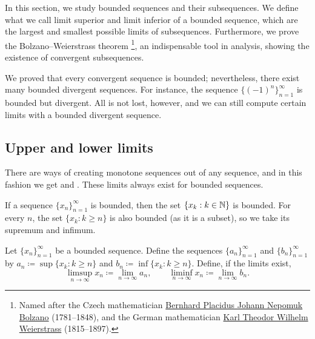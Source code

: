 
In this section, we study bounded sequences and their subsequences.
We define what we call limit superior and limit inferior
of a bounded sequence, which are the largest and smallest
possible limits of subsequences.
Furthermore, we prove the
Bolzano--Weierstrass theorem%
\footnote{%
Named after the Czech mathematician
\href{https://en.wikipedia.org/wiki/Bernard_Bolzano}{Bernhard Placidus Johann Nepomuk Bolzano}
(1781--1848), and the German mathematician
\href{https://en.wikipedia.org/wiki/Karl_Weierstrass}{Karl Theodor Wilhelm Weierstrass}
(1815--1897).}, an
indispensable tool in analysis, showing the existence of convergent
subsequences.

We proved that every convergent sequence is bounded; nevertheless,
there exist many bounded divergent sequences.  For instance,
the sequence $\bigl\{ {(-1)}^n \bigr\}_{n=1}^\infty$ is bounded
but divergent.  All is not lost, however, and we can
still compute certain limits with a bounded divergent sequence.

\subsection{Upper and lower limits}

There are ways of creating monotone sequences out of any sequence, and
in this fashion we
get \emph{} and
\emph{}.  These limits always exist for bounded
sequences.

If a sequence $\{ x_n \}_{n=1}^\infty$ is bounded, then 
the set $\{ x_k : k \in {\mathbb{N}} \}$ is bounded.  For every $n$,
the set $\{ x_k : k \geq n \}$ is also bounded (as it is a subset), so we
take its supremum and infimum.

\begin{defn} \label{liminflimsup:def}
Let $\{ x_n \}_{n=1}^\infty$ be a bounded sequence.  Define the sequences
$\{ a_n \}_{n=1}^\infty$
and $\{ b_n \}_{n=1}^\infty$ by
$a_n \coloneqq \sup \{ x_k : k \geq n \}$ and
$b_n \coloneqq \inf \{ x_k : k \geq n \}$.  
Define, if the limits exist,
\begin{equation*}
\limsup_{n \to \infty} x_n \coloneqq \lim_{n \to \infty} a_n ,
\qquad
\liminf_{n \to \infty} x_n \coloneqq \lim_{n \to \infty} b_n .
\end{equation*}
\end{defn}

